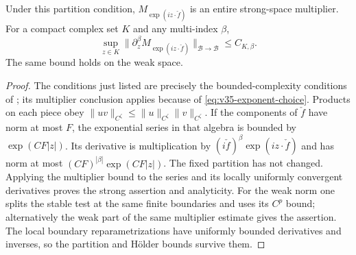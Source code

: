 \begin{lemma}
\label{lem:v35-multiplier-detail}
Under this partition condition, $M_{\exp(iz\cdot\check f)}$ is an
entire strong-space multiplier. For a compact complex set $K$ and any
multi-index $\beta$,
\begin{equation}\label{eq:v35-multiplier-derivatives}
 \sup_{z\in K}\|\partial_z^\beta
        M_{\exp(iz\cdot\check f)}\|_{\mathcal B\to\mathcal B}
       \le C_{K,\beta}.
\end{equation}
The same bound holds on the weak space.
\end{lemma}
\begin{proof}
The conditions just listed are precisely the bounded-complexity
conditions of \cite[Lemma 3.3]{DPZ}; its multiplier conclusion applies
because of \eqref{eq:v35-exponent-choice}. Products on each piece obey
$\|uv\|_{C^\zeta}\le\|u\|_{C^\zeta}\|v\|_{C^\zeta}$.
If the components of $\check f$ have norm at most $F$, the exponential
series in that algebra is bounded by $\exp(CF|z|)$. Its derivative is
multiplication by $(i\check f)^\beta\exp(iz\cdot\check f)$ and has
norm at most $(CF)^{|\beta|}\exp(CF|z|)$. The fixed partition has not
changed. Applying the multiplier bound to the series and its locally
uniformly convergent derivatives proves the strong assertion and
analyticity. For the weak norm one splits the stable test at the same
finite boundaries and uses its $C^p$ bound; alternatively the weak part
of the same multiplier estimate gives the assertion. The local boundary
reparametrizations have uniformly bounded derivatives and inverses,
so the partition and H\"older bounds survive them.
\end{proof}

